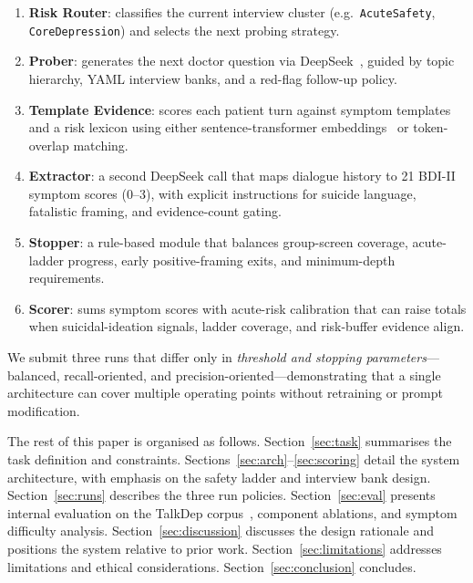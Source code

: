 \documentclass[]{ceurart}
\begin{document}
\begin{enumerate}
\item \textbf{Risk Router}: classifies the current interview cluster (e.g.\ \texttt{AcuteSafety}, \texttt{CoreDepression}) and selects the next probing strategy.
\item \textbf{Prober}: generates the next doctor question via DeepSeek~\cite{DeepSeek2024v3}, guided by topic hierarchy, YAML interview banks, and a red-flag follow-up policy.
\item \textbf{Template Evidence}: scores each patient turn against symptom templates and a risk lexicon using either sentence-transformer embeddings~\cite{Reimers2019sentencebert,Wang2020minilm} or token-overlap matching.
\item \textbf{Extractor}: a second DeepSeek call that maps dialogue history to 21 BDI-II symptom scores (0--3), with explicit instructions for suicide language, fatalistic framing, and evidence-count gating.
\item \textbf{Stopper}: a rule-based module that balances group-screen coverage, acute-ladder progress, early positive-framing exits, and minimum-depth requirements.
\item \textbf{Scorer}: sums symptom scores with acute-risk calibration that can raise totals when suicidal-ideation signals, ladder coverage, and risk-buffer evidence align.
\end{enumerate}

We submit three runs that differ only in \emph{threshold and stopping parameters}---balanced, recall-oriented, and precision-oriented---demonstrating that a single architecture can cover multiple operating points without retraining or prompt modification.

The rest of this paper is organised as follows.
Section~\ref{sec:task} summarises the task definition and constraints.
Sections~\ref{sec:arch}--\ref{sec:scoring} detail the system architecture, with emphasis on the safety ladder and interview bank design.
Section~\ref{sec:runs} describes the three run policies.
Section~\ref{sec:eval} presents internal evaluation on the TalkDep corpus~\cite{Perez2025talkdep}, component ablations, and symptom difficulty analysis.
Section~\ref{sec:discussion} discusses the design rationale and positions the system relative to prior work.
Section~\ref{sec:limitations} addresses limitations and ethical considerations.
Section~\ref{sec:conclusion} concludes.


\end{document}
